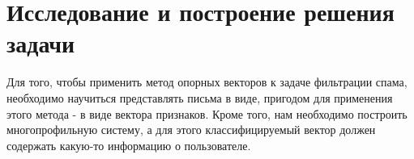 \newpage
\section{Исследование и построение решения задачи}
\label{research}

Для того, чтобы применить метод опорных векторов к задаче фильтрации спама,
необходимо научиться представлять письма в виде, пригодом для применения
этого метода - в виде вектора признаков.
Кроме того, нам необходимо построить многопрофильную систему, а для этого
классифицируемый вектор должен содержать какую-то информацию о пользователе.

